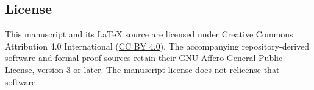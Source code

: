 \subsection*{License}

This manuscript and its \LaTeX{} source are licensed under Creative
Commons Attribution 4.0 International
(\href{https://creativecommons.org/licenses/by/4.0/}{CC BY 4.0}).
The accompanying repository-derived software and formal proof sources
retain their GNU Affero General Public License, version 3 or later.
The manuscript license does not relicense that software.

